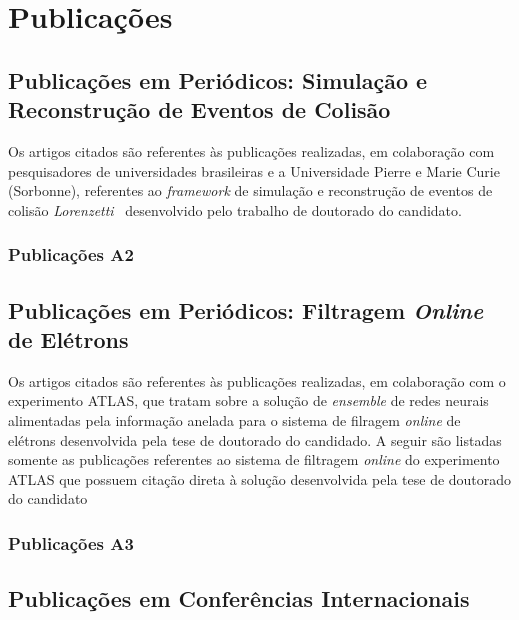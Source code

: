 \section{Publicações}


\subsection{Publicações em Periódicos: Simulação e Reconstrução de Eventos de Colisão}
Os artigos citados são referentes às publicações realizadas, em colaboração com pesquisadores de universidades brasileiras e a Universidade Pierre e Marie Curie (Sorbonne), referentes ao \emph{framework} de simulação e reconstrução de eventos de colisão \emph{Lorenzetti}~\cite{joao_victor_da_fonseca_pinto_2022_7494463} desenvolvido pelo trabalho de doutorado do candidato.


\subsubsection{Publicações A2}
\nocite{*}
\printbibliography[keyword={lorenzetti},heading=none]


\subsection{Publicações em Periódicos: Filtragem \emph{Online} de Elétrons} 

Os artigos citados são referentes às publicações realizadas, em colaboração com o experimento ATLAS, que tratam sobre a solução de \emph{ensemble} de redes neurais alimentadas pela informação anelada para o sistema de filragem \emph{online} de elétrons desenvolvida pela tese de doutorado do candidado. A seguir são listadas somente as publicações referentes ao sistema de filtragem \emph{online} do experimento ATLAS que possuem citação direta à solução desenvolvida pela tese de doutorado do candidato
\subsubsection{Publicações A3}



\subsection{Publicações em Conferências Internacionais}\label{ssec:pub_conf}

